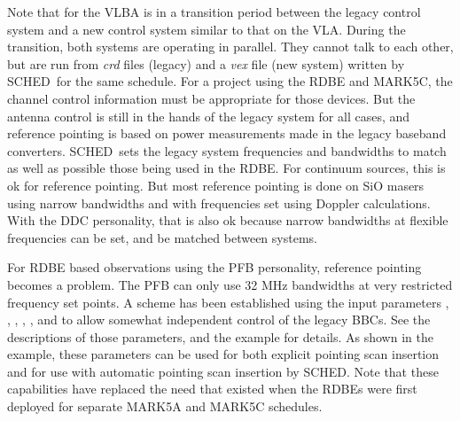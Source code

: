 \documentclass{report}
\newcommand{\sched}{{\sc SCHED}}
\newcommand{\schedb}{{\sc SCHED~}}
\begin{document}
Note that for the VLBA is in a transition period between the legacy
control system and a new control system similar to that on the VLA.
During the transition, both systems are operating in parallel.  They
cannot talk to each other, but are run from {\sl crd} files (legacy)
and a {\sl vex} file (new system) written by \schedb for the same
schedule.  For a project using the RDBE and MARK5C, the channel
control information must be appropriate for those devices.  But the
antenna control is still in the hands of the legacy system for all
cases, and reference pointing is based on power measurements made in
the legacy baseband converters.  \schedb sets the legacy system
frequencies and bandwidths to match as well as possible those being
used in the RDBE.  For continuum sources, this is ok for reference
pointing.  But most reference pointing is done on SiO masers using
narrow bandwidths and with frequencies set using Doppler calculations.
With the DDC personality, that is also ok because narrow bandwidths
at flexible frequencies can be set, and be matched between systems.

For RDBE based observations using the PFB personality, reference
pointing becomes a problem.  The PFB can only use 32 MHz bandwidths at
very restricted frequency set points.  A scheme has been established
using the input parameters ,
, ,
, , and  to
allow somewhat independent control of the legacy BBCs.  See the
descriptions of those parameters, and the example
 for
details.  As shown in the example, these parameters can be used for
both explicit pointing scan insertion and for use with automatic
pointing scan insertion by \sched.  Note that these capabilities have
replaced the need that existed when the RDBEs were first deployed for
separate MARK5A and MARK5C schedules.
\end{document}
